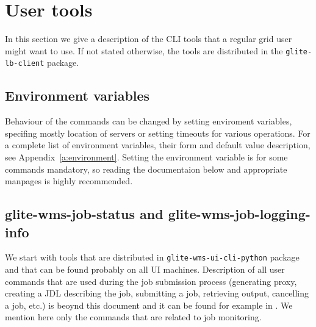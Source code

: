 %
%
\section{User tools}
\label{s:lb-tools}

In this section we give a description of the CLI tools that a regular grid user
might want to use. If not stated otherwise, the tools are distributed in the
\verb'glite-lb-client' package.

\subsection{Environment variables}

Behaviour of the commands can be changed by setting enviroment variables, specifing mostly
location of servers or setting timeouts for various operations. 
For a complete list of environment variables, their form and default value
description, see Appendix~\ref{a:environment}. Setting the environment variable
is for some commands mandatory, so reading the documentaion below and
appropriate manpages is highly recommended.


\subsection{glite-wms-job-status and glite-wms-job-logging-info}

We start with tools that are distributed in \verb'glite-wms-ui-cli-python' package
and that can be found probably on all UI machines. Description of all user
commands that are used during the job submission process (generating proxy,
creating a JDL describing the job, submitting a job, retrieving output,
cancelling a job, etc.) is beoynd this document and it can be found for example
in \cite{wmsug}. We mention here only the commands that are related to
job monitoring.

